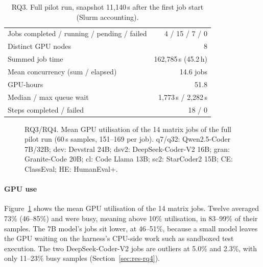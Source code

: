 \documentclass[pdflatex,sn-mathphys-num]{sn-jnl}
\theoremstyle{thmstyleone}%
\theoremstyle{thmstyletwo}%
\theoremstyle{thmstylethree}%
\begin{document}
\begin{table}[t]
\centering\small
\caption{RQ3. Full pilot run, snapshot 11{,}140\,s after the first job start (Slurm accounting).}\label{tab:full}
\begin{tabular}{@{}l r@{}}
\toprule
Jobs completed / running / pending / failed & 4 / 15 / 7 / 0 \\
Distinct GPU nodes & 8 \\
Summed job time & 162{,}785\,s (45.2\,h) \\
Mean concurrency (sum / elapsed) & 14.6 jobs \\
GPU-hours & 51.8 \\
Median / max queue wait & 1{,}773\,s / 2{,}282\,s \\
Steps completed / failed & 18 / 0 \\
\bottomrule
\end{tabular}
\end{table}

\begin{figure}[t]
\centering
{}
\caption{RQ3/RQ4. Mean GPU utilisation of the 14 matrix jobs of the full pilot
run (60\,s samples, 151--169 per job). q7/q32: Qwen2.5-Coder 7B/32B; dev:
Devstral 24B; dsv2: DeepSeek-Coder-V2 16B; gran: Granite-Code 20B; cl: Code
Llama 13B; sc2: StarCoder2 15B; CE: ClassEval; HE: HumanEval+.}
\label{fig:gpu}
\end{figure}

\paragraph{GPU use} Figure~\ref{fig:gpu} shows the mean GPU utilisation of the
14 matrix jobs. Twelve averaged 73\% (46--85\%) and were busy, meaning above
10\% utilisation, in 83--99\% of their samples. The 7B model's jobs sit lower,
at 46--51\%, because a small model leaves the GPU waiting on the harness's
CPU-side work such as sandboxed test execution. The two DeepSeek-Coder-V2 jobs
are outliers at 5.0\% and 2.3\%, with only 11--23\% busy samples
(Section~\ref{sec:res-rq4}).
\end{document}
